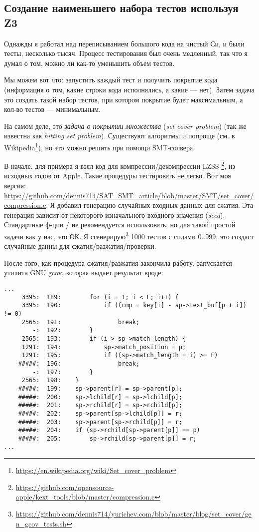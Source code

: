 \subsection{Создание наименьшего набора тестов используя Z3}
\label{set_cover}

Однажды я работал над переписыванием большого кода на чистый Си, и были тесты, несколько тысяч.
Процесс тестирования был очень медленный, так что я думал о том, можно ли как-то уменьшить объем тестов.

Мы можем вот что: запустить каждый тест и получить покрытие кода
(информация о том, какие строки кода исполнялись, а какие --- нет).
Затем задача это создать такой набор тестов, при котором покрытие будет максимальным, а кол-во тестов --- минимальным.

На самом деле, это \textit{задача о покрытии множества} (\textit{set cover problem})
(так же известна как \textit{hitting set problem}).
Существуют алгоритмы и попроще (см. в Wikipedia\footnote{\url{https://en.wikipedia.org/wiki/Set_cover_problem}}),
но это можно решить при помощи SMT-солвера.

В начале, для примера я взял код для компрессии/декомпрессии \ac{LZSS}
\footnote{\url{https://github.com/opensource-apple/kext_tools/blob/master/compression.c}},
из исходных годов от Apple.
Такие процедуры тестировать не легко.
Вот моя версия:
\url{https://github.com/dennis714/SAT_SMT_article/blob/master/SMT/set_cover/compression.c}.
Я добавил генерацию случайных входных данных для сжатия.
Эта генерация зависит от некоторого изначального входного значения (\textit{seed}).
Стандартные ф-ции / не рекомендуется использовать, но для такой простой задачи как у нас, это ОК.
Я сгенерирую\footnote{\url{https://github.com/dennis714/yurichev.com/blob/master/blog/set_cover/gen_gcov_tests.sh}}
1000 тестов с сидами 0..999, это создаст случайные данны для сжатия/разжатия/проверки.

После того, как процедура сжатия/разжатия закончила работу,
запускается утилита GNU gcov, которая выдает результат вроде:

\begin{lstlisting}
...
     3395:  189:        for (i = 1; i < F; i++) {
     3395:  190:            if ((cmp = key[i] - sp->text_buf[p + i]) != 0)
     2565:  191:                break;
        -:  192:        }
     2565:  193:        if (i > sp->match_length) {
     1291:  194:            sp->match_position = p;
     1291:  195:            if ((sp->match_length = i) >= F)
    #####:  196:                break;
        -:  197:        }
     2565:  198:    }
    #####:  199:    sp->parent[r] = sp->parent[p];
    #####:  200:    sp->lchild[r] = sp->lchild[p];
    #####:  201:    sp->rchild[r] = sp->rchild[p];
    #####:  202:    sp->parent[sp->lchild[p]] = r;
    #####:  203:    sp->parent[sp->rchild[p]] = r;
    #####:  204:    if (sp->rchild[sp->parent[p]] == p)
    #####:  205:        sp->rchild[sp->parent[p]] = r;
...
\end{lstlisting}

